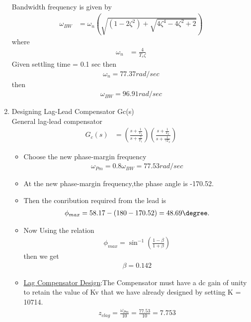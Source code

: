 \begin{enumerate}[label=\thesubsection.\arabic*.,ref=\thesubsection.\theenumi]
Bandwidth frequency is given by\\
\begin{align}
\omega_{BW} &= \omega_{n}(\sqrt{(1-2\zeta^2)+\sqrt{4\zeta^4-4\zeta^2+2}})
\end{align}
where
\begin{align}
    \omega_{n}&=\frac{4}{T_{s}\zeta}
\end{align}
Given settling time = 0.1 sec then 
\begin{align}
    \omega_{n} = 77.37 rad/sec 
\end{align}
then
\begin{align}
    \omega_{BW} = 96.91 rad/sec
\end{align}

\item 
Designing Lag-Lead Compensator Gc(s)
\\
\solution 
General lag-lead compensator 
\begin{align}
G_{c}(s) &= \left(\frac{s+\frac{1}{T_1}}{s+\frac{\gamma}{T_1}}\right)\left(\frac{s+\frac{1}{T_2}}{s+\frac{1}{\gamma T_2}}\right) 
\end{align}
\begin{itemize}
\item Choose the new phase-margin frequency 
\begin{align}
    \omega_{Pm} = 0.8\omega_{BW} = 77.53 rad/sec
\end{align}
\item At the new phase-margin frequency,the phase angle is -170.52\degree.
\item Then the conribution required from the lead is
\begin{align}
    \phi_{max} = 58.17-(180-170.52)=48.69\degree.
\end{align}
\item Now Using the relation 
\begin{align}
    \phi_{max} = \sin^{-1}(\frac{1-\beta}{1+\beta})
\end{align}
then we get
\begin{align}
    \beta=0.142
\end{align}
\item \underline{Lag Compensator Design}:The Compensator must have a dc gain of unity to retain the value of Kv that we have already designed by setting K = 10714.
\begin{align}
    z_{clag}=\frac{\omega_{Pm}}{10}=\frac{77.53}{10}=7.753
\end{align}
\begin{align}

\end{align}
\end{itemize}
\end{enumerate}

